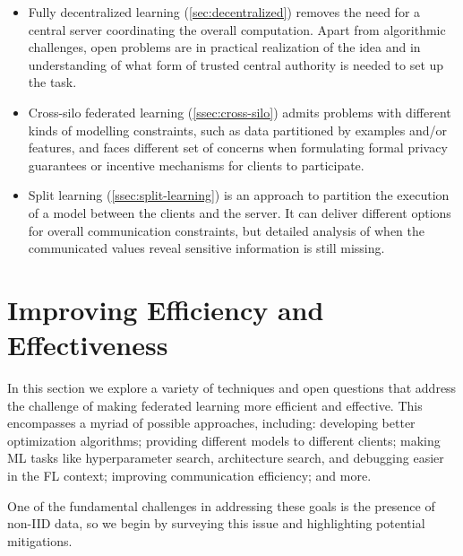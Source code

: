 \documentclass[11pt]{article}
\begin{document}
\begin{itemize}
\item Fully decentralized learning (\cref{sec:decentralized}) removes the need for a central server coordinating the overall computation. Apart from algorithmic challenges, open problems are in practical realization of the idea and in understanding of what form of trusted central authority is needed to set up the task.
\item Cross-silo federated learning (\cref{ssec:cross-silo}) admits problems with different kinds of modelling constraints, such as data partitioned by examples and/or features, and faces different set of concerns when formulating formal privacy guarantees or incentive mechanisms for clients to participate.
\item Split learning (\cref{ssec:split-learning}) is an approach to partition the execution of a model between the clients and the server. It can deliver different options for overall communication constraints, but detailed analysis of when the communicated values reveal sensitive information is still missing.
\end{itemize}


\pagebreak
\section{Improving Efficiency and Effectiveness}
\label{sec:better_fl}

In this section we explore a variety of techniques and open questions that address the challenge of making federated learning more efficient and effective. This encompasses a myriad of possible approaches, including: developing better optimization algorithms; providing different models to different clients; making ML tasks like hyperparameter search, architecture search, and debugging easier in the FL context; improving communication efficiency; and more. 

One of the fundamental challenges in addressing these goals is the presence of non-IID data, so we begin by surveying this issue and highlighting potential mitigations.

\newcommand{\Ploc}{\mathcal{P}}
\newcommand{\Pcli}{\mathcal{Q}}
\end{document}
